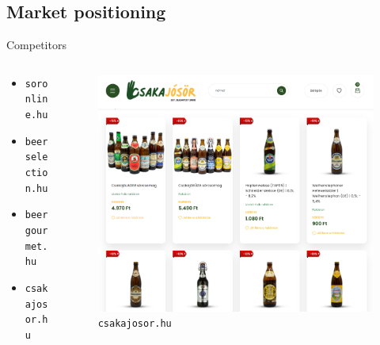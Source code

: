 \documentclass[aspectratio=43]{beamer}
\begin{document}
\subsection{Market positioning}


\begin{frame}{Competitors}

   \begin{columns}
      \begin{column}{0.4\textwidth}
         \begin{itemize}
            \item \texttt{soronline.hu}
            \item \texttt{beerselection.hu}
            \item \texttt{beergourmet.hu}
            \item \texttt{csakajosor.hu}
         \end{itemize}
      \end{column}
      \begin{column}{0.6\textwidth}
         \begin{figure}[H]
           \centering
           \includegraphics[width=\linewidth]{pics/csakajosor.png}
           \caption*{ \texttt{csakajosor.hu}}
         \end{figure}
      \end{column}
   \end{columns}


\end{frame}
\end{document}
